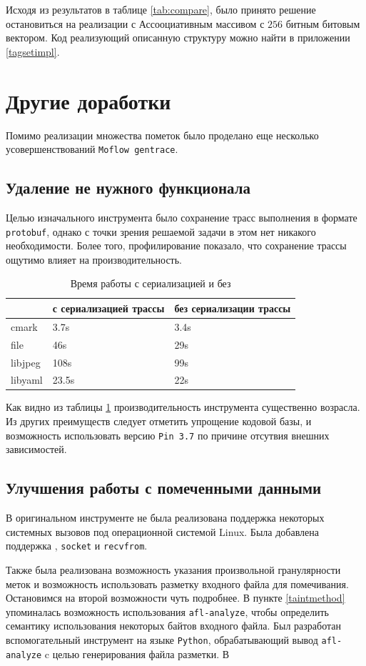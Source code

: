Исходя из результатов в таблице \ref{tab:compare}, было принято решение остановиться на реализации с Ассооциативным массивом с $256$ битным битовым вектором. Код реализующий описанную структуру можно найти в приложении \ref{tagsetimpl}.

\section{Другие доработки}

Помимо реализации множества пометок было проделано еще несколько усовершенствований \texttt{Moflow gentrace}.

\subsection{Удаление не нужного функционала}

Целью изначального инструмента было сохранение трасс выполнения в формате \texttt{protobuf}, однако с точки зрения решаемой задачи в этом нет никакого необходимости. Более того, профилирование показало, что сохранение трассы ощутимо влияет на производительность.


\begin{table}[H]
    \centering
    \caption{Время работы с сериализацией и без} \label{tab:compare2}
    \begin{tabular}[]{@{}lll@{}}
    \toprule
    & с сериализацией трассы & без сериализации трассы  \tabularnewline
    \midrule
    cmark & 3.7s & 3.4s \tabularnewline
    file & 46s & 29s \tabularnewline
    libjpeg & 108s & 99s \tabularnewline
    libyaml & 23.5s & 22s \tabularnewline
    \bottomrule
\end{tabular}
\end{table}

Как видно из таблицы \ref{tab:compare2} производительность инструмента существенно возрасла. Из других преимуществ следует отметить упрощение кодовой базы, и возможность использовать версию \texttt{Pin 3.7} по причине отсутвия внешних зависимостей.

\subsection{Улучшения работы с помеченными данными}

В оригинальном инструменте не была реализована поддержка некоторых системных вызовов под операционной системой Linux. Была добавлена поддержка , \texttt{socket} и \texttt{recvfrom}.

Также была реализована возможность указания произвольной гранулярности меток и возможность использовать разметку входного файла для помечивания. Остановимся на второй возможности чуть подробнее. 
В пункте \ref{taintmethod} упоминалась возможность использования \texttt{afl-analyze}, чтобы определить семантику использования некоторых байтов входного файла. Был разработан вспомогательный инструмент на языке \texttt{Python}, обрабатывающий вывод \texttt{afl-analyze} c целью генерирования файла разметки. В \texttt{}